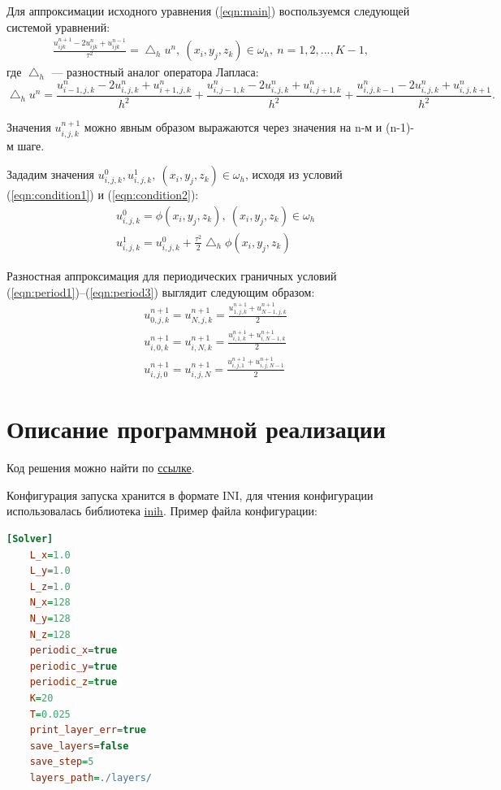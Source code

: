 \documentclass[oneside, final, 12pt]{extarticle}
\begin{document}
Для аппроксимации исходного уравнения (\ref{eqn:main}) воспользуемся следующей системой уравнений:
\begin{align}
\frac{u_{ijk}^{n + 1} - 2u_{ijk}^{n} + u_{ijk}^{n - 1} }{\tau ^ 2} = \bigtriangleup_h u^n, \: (x_i, y_j, z_k) \in \omega_h, \: n = 1, 2, ..., K - 1, \label{eqn:approx}
\end{align}
где $ \bigtriangleup_h $ --- разностный аналог оператора Лапласа:
$$
\bigtriangleup_h u^n = \frac{u^n_{i - 1, j, k} - 2u^n_{i, j, k} + u^n_{i + 1, j, k}}{h^2} + 
\frac{u^n_{i, j - 1, k} - 2u^n_{i, j, k} + u^n_{i, j + 1, k}}{h^2} + 
\frac{u^n_{i, j, k - 1} - 2u^n_{i, j, k} + u^n_{i, j, k + 1}}{h^2}.
$$

Значения $u^{n + 1}_{i,j,k}$ можно явным образом выражаются через значения на n-м и (n-1)-м шаге. 

Зададим значения $ u_{i, j, k}^{0}, u_{i, j, k}^{1}, \: (x_i, y_j, z_k) \in \omega_h $, исходя из условий (\ref{eqn:condition1}) и (\ref{eqn:condition2}):
\begin{align}
& u^0_{i,j,k} = \phi(x_i, y_j, z_k), \: (x_i, y_j, z_k) \in \omega_h \\
& u^1_{i,j,k} = u^0_{i,j,k} + \frac{\tau ^ 2}{2}  \bigtriangleup_h \phi(x_i, y_j, z_k) \label{eqn:u1}
\end{align}

Разностная аппроксимация для периодических граничных условий (\ref{eqn:period1})--(\ref{eqn:period3}) выглядит следующим образом:
\begin{align*}
& u^{n + 1}_{0,j,k} = u^{n + 1}_{N,j,k} = \frac{u^{n + 1}_{1,j,k} + u^{n + 1}_{N - 1,j,k}}{2} \\
& u^{n + 1}_{i,0,k} = u^{n + 1}_{i,N,k} = \frac{u^{n + 1}_{i,1,k} + u^{n + 1}_{i,N - 1,k}}{2} \\
& u^{n + 1}_{i,j,0} = u^{n + 1}_{i,j,N} = \frac{u^{n + 1}_{i,j,1} + u^{n + 1}_{i,j,N - 1}}{2}
\end{align*}

\section{Описание программной реализации}

Код решения можно найти по \href{https://github.com/shorohml/SuperComp/tree/master/task3}{ссылке}.

Конфигурация запуска хранится в формате INI, для чтения конфигурации использовалась библиотека \href{https://github.com/jtilly/inih}{inih}.
Пример файла конфигурации:
\begin{lstlisting}[language={INI}]
[Solver]
    L_x=1.0
    L_y=1.0
    L_z=1.0
    N_x=128
    N_y=128
    N_z=128
    periodic_x=true
    periodic_y=true
    periodic_z=true
    K=20
    T=0.025
    print_layer_err=true
    save_layers=false
    save_step=5
    layers_path=./layers/    
\end{lstlisting}
\end{document}
